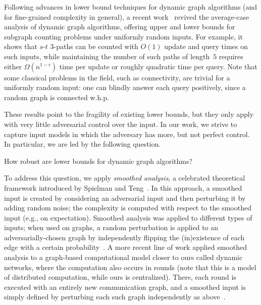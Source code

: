 \documentclass[letter,11pt]{article}
\newcommand{\paths}[3]{${#1}$-${#2}$ ${#3}$-paths\xspace}
\begin{document}
Following advances in lower bound techniques for dynamic graph algorithms (and for fine-grained complexity in general), a recent work~\cite{HLS22} revived the average-case analysis of dynamic graph algorithms, offering upper and lower bounds for subgraph counting problems under uniformly random inputs.
For example, it shows that \paths{s}{t}{3} can be counted
with $O(1)$ update and query times on such inputs,
while maintaining the number of such paths of length~$5$
requires either $\Omega\left( n^{1-\epsilon} \right)$ time per update or roughly quadratic time per query.
Note that some classical problems in the field, such as connectivity, are trivial for a uniformly random input: one can blindly answer each query positively, since a random graph is connected w.h.p.

These results point to the fragility of existing lower bounds, but they only apply with very little adversarial control over the input.
In our work, we strive to capture input models in which the adversary has more, but not perfect control.
In particular, we are led by the following question.

\begin{tcolorbox}[colback=blue!10, colframe=blue!30, halign=center]
	{
        How robust are lower bounds for dynamic graph algorithms?
        }%
\end{tcolorbox}


To address this question, we apply \emph{smoothed analysis}, a celebrated theoretical framework introduced by Spielman and Teng~\cite{SpielmanT04,SpielmanT09}.
In this approach, a smoothed input is created by considering an adversarial input
and then perturbing it by adding random noise;
the complexity is computed with respect to the smoothed input (e.g., on expectation).
Smoothed analysis was applied to different types of inputs;
when used on graphs, a random perturbation is applied to an adversarially-chosen graph 
by independently flipping the (in)existence of each edge with a certain probability~\cite{krivelevich2006smoothed,friedrich2011smoothed,krivelevich2015smoothed}.
A more recent line of work applied smoothed analysis to a graph-based computational model closer to ours called dynamic networks, where the computation also occurs in rounds (note that this is a model of distributed computation, while ours is centralized).
There, each round is executed with an entirely new communication graph, and a smoothed input is simply defined by perturbing each such graph independently as above~\cite{DFGN18,MPS20,DFGN22}.
\end{document}
